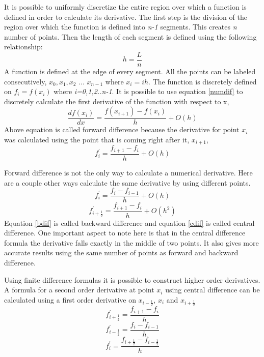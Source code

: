 \begin{doublespace}
It is possible to uniformly discretize the entire region over which a function is defined in order to calculate its derivative. The first step is the division of the region over which the function is defined into \textit{n-1} segments. This creates \textit{n} number of points. Then the length of each segment is defined using the following relationship:
\begin{equation}
h=\frac{L}{n}
\end{equation}
A function is defined at the edge of every segment. All the points can be labeled consecutively, $x_0,x_1,x_2$ ... $x_{n-1}$ where $x_i=ih$. The function is discretely defined on \textit{$f_{i}=f(x_{i})$} where\textit{ i=0,1,2..n-1}. It is possible to use equation  \ref{numdif} to discretely calculate the first derivative of the function with respect to x,
\begin{equation}
\frac{df(x_i)}{dx}=\frac{f(x_{i+1})-f(x_i)}{h} + O(h)
\end{equation}
Above equation is called forward difference because the derivative for point $x_i$ was calculated using the point that is coming right after it, $x_{i+1}$,
\begin{equation}
f^{'}_i=\frac{f_{i+1}-f_i}{h}+ O(h)
\end{equation}

Forward difference is not the only way to calculate a numerical derivative. Here are a couple other ways calculate the same derivative by using different points.
\begin{equation}
f^{'}_i=\frac{f_{i}-f_{i-1}}{h}+ O(h)
\label{bdif}
\end{equation}
\begin{equation}
f^{'}_{i+\frac{1}{2}}=\frac{f_{i+1}-f_i}{h}+ O(h^2)
\label{cdif}
\end{equation}
Equation \ref{bdif} is called backward difference and equation \ref{cdif} is called central difference. One important aspect to note here is that in the central difference formula the derivative falls exactly in the middle of two points. It also gives more accurate results using the same number of points as forward and backward difference. 

Using finite difference formulas it is possible to construct higher order derivatives. A formula for a second order derivative at point $x_i$ using central difference can be calculated using a first order derivative on $x_{i-\frac{1}{2}}$, $x_i$ and $x_{i+\frac{1}{2}}$  
\begin{equation}
f_{i+\frac{1}{2}}^{'}=\frac{f_{i+1}-f_{i}}{h}
\label{forwardd}
\end{equation}
\begin{equation}
f_{i-\frac{1}{2}}^{'}=\frac{f_{i}-f_{i-1}}{h}
\label{backwardd}
\end{equation}
\begin{equation}
f^{'}_{i}=\frac{f_{i+\frac{1}{2}}-f_{i-\frac{1}{2}}}{h}
\label{2ndord}
\end{equation}


\end{doublespace}
